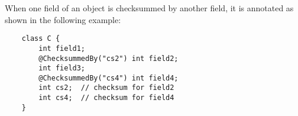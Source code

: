 When one field of an object is checksummed by another field, it is annotated as shown in the following example:

\begin{Verbatim}
    class C {
        int field1;
        @ChecksummedBy("cs2") int field2;
        int field3;
        @ChecksummedBy("cs4") int field4;
        int cs2;  // checksum for field2
        int cs4;  // checksum for field4
    }
\end{Verbatim}


